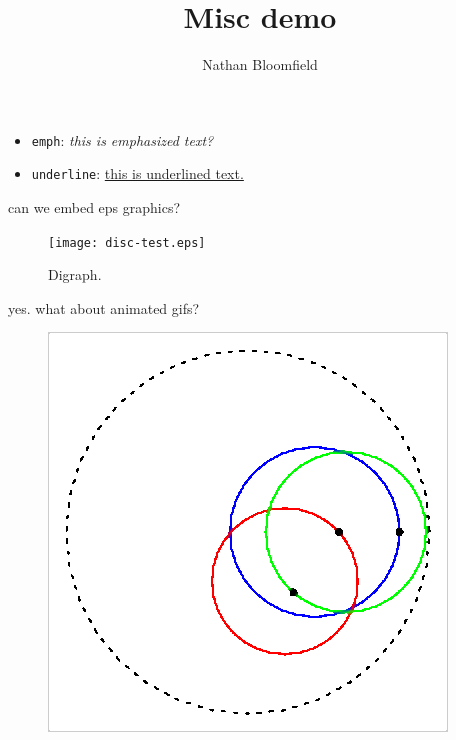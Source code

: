 \documentclass{ximera}
\title{Misc demo}
\author{Nathan Bloomfield}
\begin{document}
\maketitle

\begin{itemize}
\item \texttt{emph}: \emph{this is emphasized text?}
\item \texttt{underline}: \underline{this is underlined text.}
\end{itemize}

can we embed eps graphics?

\begin{figure}[!htb]
\begin{center}
\texttt{[image: disc-test.eps]}
\caption{Digraph.}
\end{center}
\label{fig:digraph}
\end{figure}

yes. what about animated gifs?

\begin{figure}
\begin{center}
\includegraphics[type=gif]{./005-ani.gif}
\end{center}
\end{figure}
\end{document}
